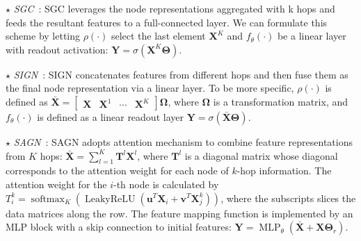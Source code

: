 \message{ !name(main.tex)}\documentclass{article}
\newcommand{\bm}[1]{\mathbf{#1}}
\begin{document}
\(\star\) \textit{SGC}~\cite{wu2019simplifying}: SGC leverages the node representations aggregated with k hops and feeds the resultant features to a full-connected layer. We can formulate this scheme by letting $\rho(\cdot)$ select the last element $\bm{X}^K$ and $f_{\theta}(\cdot)$ be a linear layer with readout activation: $\bm{Y} = \sigma(\bm{X}^K \boldsymbol{\Theta})$.

\noindent
\(\star\) \textit{SIGN}~\cite{frasca2020sign}: SIGN concatenates features from different hops and then fuse them as the final node representation via a linear layer. To be more specific, $\rho(\cdot)$ is defined as $\bar{\bm{X}} = \begin{bmatrix}\bm{X} & \bm{X}^{1} & \cdots & \bm{X}^{K}\end{bmatrix} \boldsymbol{\Omega}$, where \(\boldsymbol{\Omega}\) is a transformation matrix, and $f_{\theta}(\cdot)$ is defined as a linear readout layer $\bm{Y} = \sigma(\bar{\bm{X}} \boldsymbol{\Theta})$.

\noindent
\(\star\) \textit{SAGN}~\cite{sun2021scalable}: SAGN adopts attention mechanism to combine feature representations from $K$ hops: $\bar{\bm{X}} = \sum_{l=1}^K \bm{T}^{l} \bm{X}^l$, where $\bm{T}^{l}$ is a diagonal matrix whose diagonal corresponds to the attention weight for each node of $k$-hop information. The attention weight for the $i$-th node is calculated by $T_i^{k} = \operatorname{softmax}_K(\operatorname{LeakyReLU}(\boldsymbol{u}^T \bm{X}_i + \boldsymbol{v}^T\bm{X}^k_j))$, where the subscripts slices the data matrices along the row.
The feature mapping function is implemented by an MLP block with a skip connection to initial features: $\bm{Y} = \operatorname{MLP}_\theta(\bar{\bm{X}} + \bm{X} \boldsymbol{\Theta}_r)$.


\vspace{-2mm}
\end{document}
